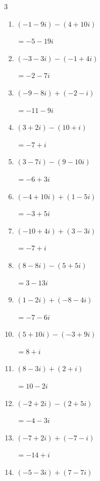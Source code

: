 \begin{multicols}{3}
\begin{enumerate}
  \item $\displaystyle (-1-9i) - (4+10i)$

        $\displaystyle =-5-19i$

  \item $\displaystyle (-3-3i) - (-1+4i)$

        $\displaystyle =-2-7i$

  \item $\displaystyle (-9-8i) + (-2-i)$

        $\displaystyle =-11-9i$

  \item $\displaystyle (3+2i) - (10+i)$

        $\displaystyle =-7+i$

  \item $\displaystyle (3-7i) - (9-10i)$

        $\displaystyle =-6+3i$

  \item $\displaystyle (-4+10i) + (1-5i)$

        $\displaystyle =-3+5i$

  \item $\displaystyle (-10+4i) + (3-3i)$

        $\displaystyle =-7+i$

  \item $\displaystyle (8-8i) - (5+5i)$

        $\displaystyle =3-13i$

\columnbreak %

  \item $\displaystyle (1-2i) + (-8-4i)$

        $\displaystyle =-7-6i$

  \item $\displaystyle (5+10i) - (-3+9i)$

        $\displaystyle =8+i$

  \item $\displaystyle (8-3i) + (2+i)$

        $\displaystyle =10-2i$

  \item $\displaystyle (-2+2i) - (2+5i)$

        $\displaystyle =-4-3i$

  \item $\displaystyle (-7+2i) + (-7-i)$

        $\displaystyle =-14+i$

  \item $\displaystyle (-5-3i) + (7-7i)$


\end{enumerate}
\end{multicols}
